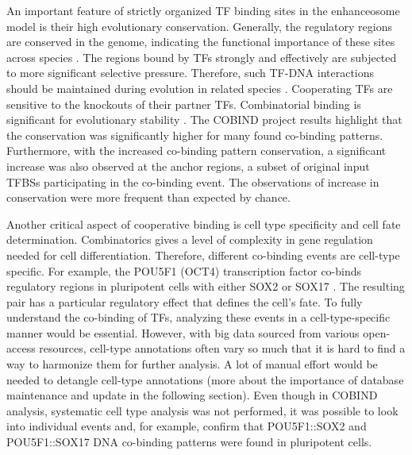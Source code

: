     An important feature of strictly organized TF binding sites in the enhanceosome model is their high evolutionary conservation. Generally, the regulatory regions are conserved in the genome, indicating the functional importance of these sites across species \cite{berthelot2018complexity}. The regions bound by TFs strongly and effectively are subjected to more significant selective pressure. Therefore, such TF-DNA interactions should be maintained during evolution in related species \cite{stefflova2013cooperativity}. Cooperating TFs are sensitive to the knockouts of their partner TFs. Combinatorial binding is significant for evolutionary stability \cite{stefflova2013cooperativity}. The COBIND project results highlight that the conservation was significantly higher for many found co-binding patterns. Furthermore, with the increased co-binding pattern conservation, a significant increase was also observed at the anchor regions, a subset of original input TFBSs participating in the co-binding event. The observations of increase in conservation were more frequent than expected by chance.

    Another critical aspect of cooperative binding is cell type specificity and cell fate determination. Combinatorics gives a level of complexity in gene regulation needed for cell differentiation. Therefore, different co-binding events are cell-type specific. For example, the POU5F1 (OCT4) transcription factor co-binds regulatory regions in pluripotent cells with either SOX2 or SOX17 \cite{li2018deconstructing,aksoy2013oct4}. The resulting pair has a particular regulatory effect that defines the cell's fate. To fully understand the co-binding of TFs, analyzing these events in a cell-type-specific manner would be essential. However, with big data sourced from various open-access resources, cell-type annotations often vary so much that it is hard to find a way to harmonize them for further analysis. A lot of manual effort would be needed to detangle cell-type annotations (more about the importance of database maintenance and update in the following section). Even though in COBIND analysis, systematic cell type analysis was not performed, it was possible to look into individual events and, for example, confirm that POU5F1::SOX2 and POU5F1::SOX17 DNA co-binding patterns were found in pluripotent cells.

